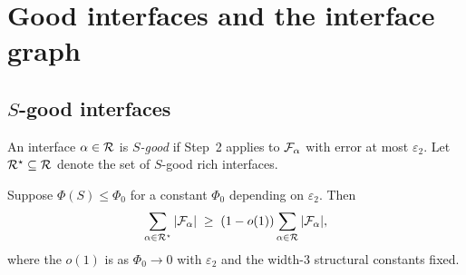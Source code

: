 \section{Good interfaces and the interface graph}\label{sec:interface-graph}

\subsection{$S$-good interfaces}

\begin{definition}
An interface $\alpha\in\mathcal{R}$ is \emph{$S$-good} if Step~2 applies to
$\mathcal{F}_{\alpha}$ with error at most $\varepsilon_2$.  Let
$\mathcal{R}^\star\subseteq\mathcal{R}$ denote the set of $S$-good rich interfaces.
\end{definition}

\begin{lemma}\label{lem:most-good}
Suppose $\Phi(S)\le \Phi_0$ for a constant $\Phi_0$ depending on
$\varepsilon_2$.  Then
\[
\sum_{\alpha\in\mathcal{R}^\star} |\mathcal{F}_{\alpha}|
\;\ge\;
(1-o(1))\sum_{\alpha\in\mathcal{R}} |\mathcal{F}_{\alpha}|,
\]
where the $o(1)$ is as $\Phi_0\to 0$ with $\varepsilon_2$ and the
width-3 structural constants fixed.
\end{lemma}

